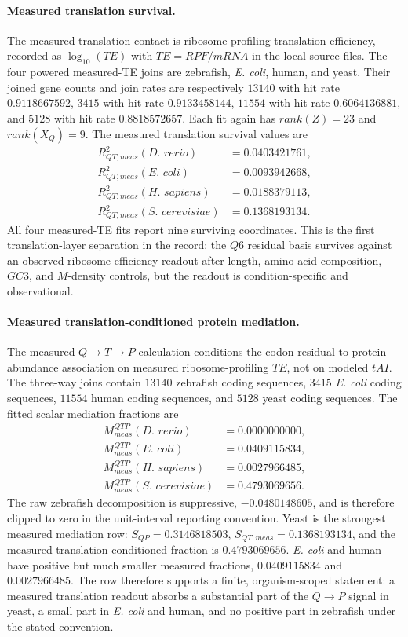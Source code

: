 \paragraph{Measured translation survival.}
The measured translation contact is ribosome-profiling translation efficiency, recorded as $\log_{10}(TE)$ with $TE=RPF/mRNA$ in the local source files.  The four powered measured-TE joins are zebrafish, \textit{E. coli}, human, and yeast.  Their joined gene counts and join rates are respectively $13140$ with hit rate $0.9118667592$, $3415$ with hit rate $0.9133458144$, $11554$ with hit rate $0.6064136881$, and $5128$ with hit rate $0.8818572657$.  Each fit again has $rank(Z)=23$ and $rank(X_{Q})=9$.  The measured translation survival values are
$$
\begin{aligned}
R^{2}_{QT,meas}(\textit{D. rerio})&=0.0403421761,\\
R^{2}_{QT,meas}(\textit{E. coli})&=0.0093942668,\\
R^{2}_{QT,meas}(\textit{H. sapiens})&=0.0188379113,\\
R^{2}_{QT,meas}(\textit{S. cerevisiae})&=0.1368193134.
\end{aligned}
$$
All four measured-TE fits report nine surviving coordinates.  This is the first translation-layer separation in the record: the $Q6$ residual basis survives against an observed ribosome-efficiency readout after length, amino-acid composition, $GC3$, and $M$-density controls, but the readout is condition-specific and observational.

\paragraph{Measured translation-conditioned protein mediation.}
The measured $Q\to T\to P$ calculation conditions the codon-residual to protein-abundance association on measured ribosome-profiling $TE$, not on modeled $tAI$.  The three-way joins contain $13140$ zebrafish coding sequences, $3415$ \textit{E. coli} coding sequences, $11554$ human coding sequences, and $5128$ yeast coding sequences.  The fitted scalar mediation fractions are
$$
\begin{aligned}
M^{QTP}_{meas}(\textit{D. rerio})&=0.0000000000,\\
M^{QTP}_{meas}(\textit{E. coli})&=0.0409115834,\\
M^{QTP}_{meas}(\textit{H. sapiens})&=0.0027966485,\\
M^{QTP}_{meas}(\textit{S. cerevisiae})&=0.4793069656.
\end{aligned}
$$
The raw zebrafish decomposition is suppressive, $-0.0480148605$, and is therefore clipped to zero in the unit-interval reporting convention.  Yeast is the strongest measured mediation row: $S_{QP}=0.3146818503$, $S_{QT,meas}=0.1368193134$, and the measured translation-conditioned fraction is $0.4793069656$.  \textit{E. coli} and human have positive but much smaller measured fractions, $0.0409115834$ and $0.0027966485$.  The row therefore supports a finite, organism-scoped statement: a measured translation readout absorbs a substantial part of the $Q\to P$ signal in yeast, a small part in \textit{E. coli} and human, and no positive part in zebrafish under the stated convention.

